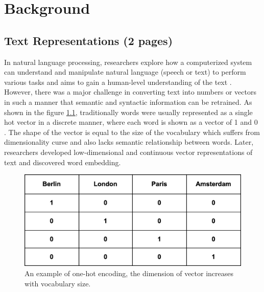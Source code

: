 \documentclass[%
	BCOR=8mm, %
	DIV=12,
	toc=bibliography, %
	toc=listof, %
	oneside, %
	egregdoesnotlikesansseriftitles, %
	]{scrbook}
\begin{document}
\chapter{Background}
\label{section:background}
\section{Text Representations (2 pages)}
\label{section: textrep}
In natural language processing, researchers explore how a computerized system can understand and manipulate natural language (speech or text) to perform various tasks \cite{chowdhury_natural_2003} and aims to gain a human-level understanding of the text \cite{naseem_comprehensive_2020}. However, there was a major challenge in converting text into numbers or vectors in such a manner that semantic and syntactic information can be retrained. As shown in the figure \ref{fig:onehot}, traditionally words were usually represented as a single hot vector in a discrete manner, where each word is shown as a vector of 1 and 0 \cite{salton_vector_1975}. The shape of the vector is equal to the size of the vocabulary which suffers from dimensionality curse and also lacks semantic relationship between words. Later, researchers developed low-dimensional and continuous vector representations of text and discovered word embedding.
\begin{figure}[h!]
    \centering
    \includegraphics[width=0.4\linewidth]{img/onehot.png}
    \caption[Example of one-hot encoding.]{ An example of one-hot encoding, the dimension of vector increases with vocabulary size.}
    \label{fig:onehot}
\end{figure}
\end{document}
